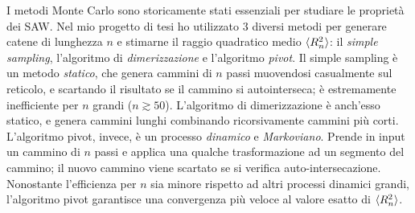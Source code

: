 \documentclass[12pt]{article}
\begin{document}
I metodi Monte Carlo sono storicamente stati essenziali per studiare le proprietà dei SAW. Nel mio progetto di tesi ho utilizzato 3 diversi metodi per generare catene di lunghezza $n$ e stimarne il raggio quadratico medio $\braket{R_n^2}$: il \textit{simple sampling}, l'algoritmo di \textit{dimerizzazione} e l'algoritmo \textit{pivot}. Il simple sampling è un metodo \textit{statico}, che genera cammini di $n$ passi muovendosi casualmente sul reticolo, e scartando il risultato se il cammino si autointerseca; è estremamente inefficiente per $n$ grandi ($n\gtrsim 50$). L'algoritmo di dimerizzazione è anch'esso statico, e genera cammini lunghi combinando ricorsivamente cammini più corti. L'algoritmo pivot, invece, è un processo \textit{dinamico} e \textit{Markoviano}. Prende in input un cammino di $n$ passi e applica una qualche trasformazione ad un segmento del cammino; il nuovo cammino viene scartato se si verifica auto-intersecazione. Nonostante l'efficienza per $n$ sia minore rispetto ad altri processi dinamici grandi, l'algoritmo pivot garantisce una convergenza più veloce al valore esatto di $\braket{R_n^2}$.






\end{document}
